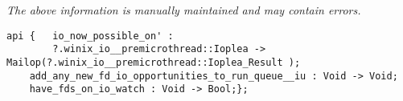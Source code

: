 \label{api:Io\_Now\_Possible\_Mailop}

{\tiny \it The above information is manually maintained and may contain errors.}
\begin{verbatim}
api {   io_now_possible_on' :
        ?.winix_io__premicrothread::Ioplea -> Mailop(?.winix_io__premicrothread::Ioplea_Result );
    add_any_new_fd_io_opportunities_to_run_queue__iu : Void -> Void;
    have_fds_on_io_watch : Void -> Bool;};
\end{verbatim}
